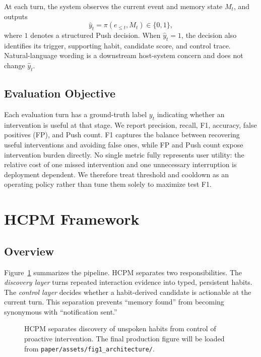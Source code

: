 \documentclass[sigconf,anonymous,review]{acmart}
\newcommand{\system}{HCPM}
\begin{document}
At each turn, the system observes the current event and memory state $M_t$, and outputs
\begin{equation}
\hat{y}_t = \pi(e_{\leq t},M_t) \in \{0,1\},
\end{equation}
where $1$ denotes a structured Push decision.
When $\hat{y}_t=1$, the decision also identifies its trigger, supporting habit, candidate score, and control trace.
Natural-language wording is a downstream host-system concern and does not change $\hat{y}_t$.

\subsection{Evaluation Objective}

Each evaluation turn has a ground-truth label $y_t$ indicating whether an intervention is useful at that stage.
We report precision, recall, F1, accuracy, false positives (FP), and Push count.
F1 captures the balance between recovering useful interventions and avoiding false ones, while FP and Push count expose intervention burden directly.
No single metric fully represents user utility: the relative cost of one missed intervention and one unnecessary interruption is deployment dependent.
We therefore treat threshold and cooldown as an operating policy rather than tune them solely to maximize test F1.

\section{HCPM Framework}

\subsection{Overview}

Figure~\ref{fig:architecture} summarizes the pipeline.
\system{} separates two responsibilities.
The \emph{discovery layer} turns repeated interaction evidence into typed, persistent habits.
The \emph{control layer} decides whether a habit-derived candidate is actionable at the current turn.
This separation prevents ``memory found'' from becoming synonymous with ``notification sent.''

\begin{figure}[t]
    \centering
    \caption{\system{} separates discovery of unspoken habits from control of proactive intervention. The final production figure will be loaded from \texttt{paper/assets/fig1\_architecture/}.}
    \label{fig:architecture}
\end{figure}
\end{document}
